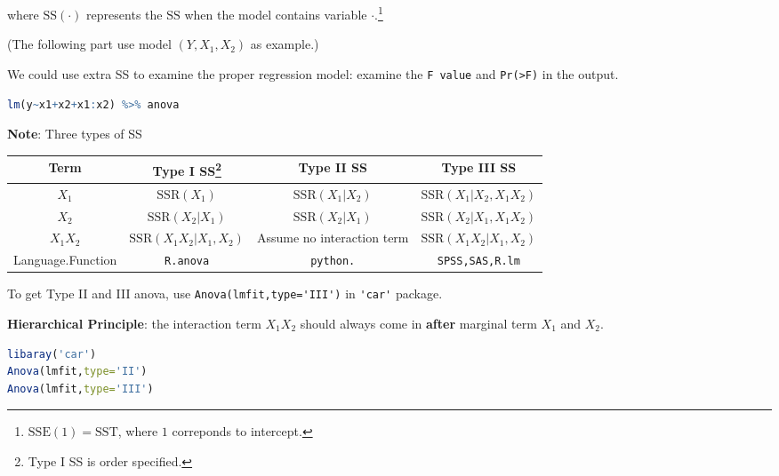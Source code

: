     where $ \mathrm{SS}(\cdot)  $ represents the $ \mathrm{SS} $ when the model contains variable $ \cdot $.\footnote{$ \mathrm{SSE}(1)=\mathrm{SST} $, where $ 1 $ correponds to intercept.}
    
    
    (The following part use model $ (Y,X_1,X_2) $ as example.)


    We could use extra SS to examine the proper regression model: examine the \lstinline|F value| and \lstinline|Pr(>F)| in the output.
\begin{rcode}
\begin{lstlisting}[language=R]
lm(y~x1+x2+x1:x2) %>% anova
\end{lstlisting}
\end{rcode}

    \textbf{Note}: Three types of SS 
\begin{table}[H]
    \centering
    \renewcommand\arraystretch{1.15}
    \begin{tabular}{c|ccc}
        \hline
        Term&Type I SS\footnote{Type I SS is order specified.}&Type II SS&Type III SS\\\hline
        $ X_1 $&$ \mathrm{SSR}(X_1) $&$ \mathrm{SSR}(X_1|X_2)  $&$ \mathrm{SSR}(X_1|X_2,X_1X_2)  $\\
        $ X_2 $&$ \mathrm{SSR}(X_2|X_1) $&$ \mathrm{SSR}(X_2|X_1)  $&$ \mathrm{SSR}(X_2|X_1,X_1X_2)  $\\
        $ X_1X_2 $&$ \mathrm{SSR}(X_1X_2|X_1,X_2) $&Assume no interaction term &$ \mathrm{SSR}(X_1X_2|X_1,X_2)  $\\\hline
        Language.Function&\lstinline|R.anova|&\lstinline|python.|&\lstinline|SPSS,SAS,R.lm|\\
        \hline
    \end{tabular}
\end{table}

    To get Type II and III anova, use \lstinline|Anova(lmfit,type='III')| in \lstinline|'car'| package.

    \textbf{Hierarchical Principle}: the interaction term $ X_1X_2 $ should always come in \textbf{after}  marginal term $ X_1 $ and $ X_2 $.  

\begin{rcode}
\begin{lstlisting}[language=R]
libaray('car')
Anova(lmfit,type='II')
Anova(lmfit,type='III')
\end{lstlisting}
\end{rcode}






